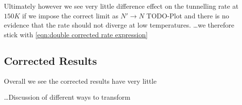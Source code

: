 Ultimately however we see very little
difference effect
on the tunnelling rate
at \(150K\) if we impose the
correct limit as \(N' \rightarrow N\) TODO-Plot
and there is no evidence that the
rate should not diverge at low temperatures.
\ldots we therefore stick with
\cref{eqn:double corrected rate expression}

\subsection{Corrected Results}
Overall we see the corrected results
have very little



\ldots Discussion of different ways to transform




